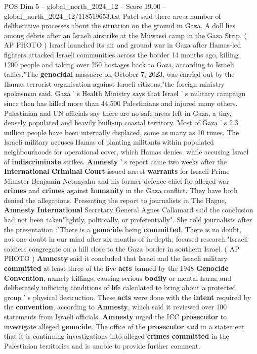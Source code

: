 \begin{textsample}{POS Dim 5 – global\_north\_2024\_12 – Score 19.00 – global\_north\_2024\_12/118519653.txt}
Patel said there are a number of deliberative processes about the situation on the ground in Gaza.
A doll lies among debris after an Israeli airstrike at the Muwassi camp in the Gaza Strip. ( AP PHOTO ) Israel launched its air and ground war in Gaza after Hamas-led fighters attacked Israeli communities across the border 14 months ago, killing 1200 people and taking over 250 hostages back to Gaza, according to Israeli tallies."The \textbf{genocidal} massacre on October 7, 2023, was carried out by the Hamas terrorist organisation against Israeli citizens,"the foreign ministry spokesman said.
Gaza ' s Health Ministry says that Israel ' s military campaign since then has killed more than 44,500 Palestinians and injured many others.
Palestinian and UN officials say there are no safe areas left in Gaza, a tiny, densely populated and heavily built-up coastal territory.
Most of Gaza ' s 2.3 million people have been internally displaced, some as many as 10 times.
The Israeli military accuses Hamas of planting militants within populated neighbourhoods for operational cover, which Hamas denies, while accusing Israel of \textbf{indiscriminate} strikes. \textbf{Amnesty} ' s report came two weeks after the \textbf{International} \textbf{Criminal} \textbf{Court} issued arrest \textbf{warrants} for Israeli Prime Minister Benjamin Netanyahu and his former defence chief for alleged war \textbf{crimes} and \textbf{crimes} against \textbf{humanity} in the Gaza conflict.
They have both denied the allegations.
Presenting the report to journalists in The Hague, \textbf{Amnesty} \textbf{International} Secretary General Agnes Callamard said the conclusion had not been taken"lightly, politically, or preferentially".
She told journalists after the presentation :"There is a \textbf{genocide} being \textbf{committed}.
There is no doubt, not one doubt in our mind after six months of in-depth, focused research."Israeli soldiers congregate on a hill close to the Gaza border in southern Israel. ( AP PHOTO ) \textbf{Amnesty} said it concluded that Israel and the Israeli military \textbf{committed} at least three of the five \textbf{acts} banned by the 1948 \textbf{Genocide} \textbf{Convention}, namely killings, causing serious \textbf{bodily} or mental harm, and deliberately inflicting conditions of life calculated to bring about a protected group ' s physical destruction.
These \textbf{acts} were done with the \textbf{intent} required by the \textbf{convention}, according to \textbf{Amnesty}, which said it reviewed over 100 statements from Israeli officials. \textbf{Amnesty} urged the ICC \textbf{prosecutor} to investigate alleged \textbf{genocide}.
The office of the \textbf{prosecutor} said in a statement that it is continuing investigations into alleged \textbf{crimes} \textbf{committed} in the Palestinian territories and is unable to provide further comment.

\end{textsample}
